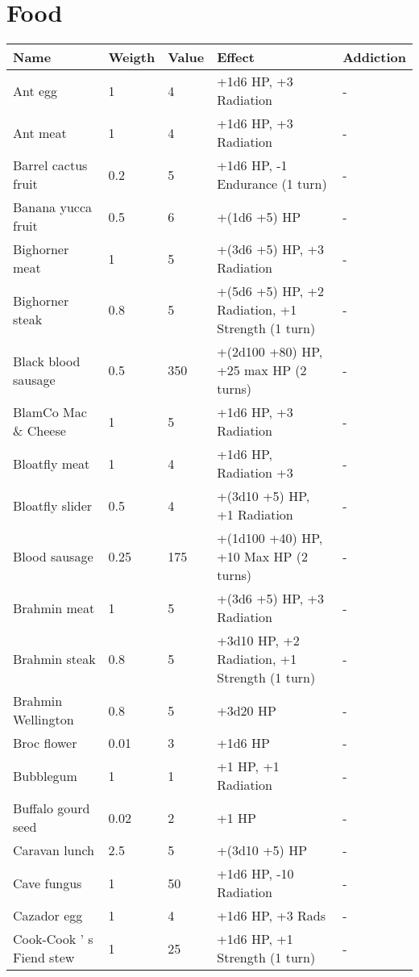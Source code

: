 \documentclass{report}
\begin{document}
\begin{table}[H]
\begin{table}[H]
\begin{table}[H]
\begin{table}[H]
\begin{table}[H]
\begin{table}[H]
\begin{table}[H]
\begin{table}[H]
\begin{table}[H]
\begin{table}[H]
\begin{table}[H]
\begin{table}[H]
\begin{table}[H]
\begin{table}[H]
\chapter{Food}
\begin{table}[H]
  \centering
  \begin{tabular}{p{30mm}p{30mm}p{30mm}p{30mm}p{30mm}}
\bfseries Name & \bfseries Weigth & \bfseries Value & \bfseries Effect & \bfseries Addiction \\
\hline
Ant egg  & 1 & 4 & +1d6 HP, +3 Radiation  & -  \\
Ant meat  & 1 & 4 & +1d6 HP, +3 Radiation  & -  \\
Barrel cactus fruit  & 0.2  & 5 & +1d6 HP, -1 Endurance (1 turn)  & -  \\
Banana yucca fruit  & 0.5  & 6 & +(1d6 +5) HP  & -  \\
Bighorner meat  & 1 & 5 & +(3d6 +5) HP, +3 Radiation  & -  \\
Bighorner steak  & 0.8  & 5 & +(5d6 +5) HP, +2 Radiation, +1 Strength (1 turn)  & -  \\
Black blood sausage  & 0.5  & 350 & +(2d100 +80) HP, +25 max HP (2 turns)  & -  \\
BlamCo Mac  \&  Cheese  & 1 & 5 & +1d6 HP, +3 Radiation  & -  \\
Bloatfly meat  & 1 & 4 & +1d6 HP, Radiation +3  & -  \\
Bloatfly slider  & 0.5  & 4 & +(3d10 +5) HP, +1 Radiation  & -  \\
Blood sausage  & 0.25  & 175 & +(1d100 +40) HP, +10 Max HP (2 turns)  & -  \\
Brahmin meat  & 1 & 5 & +(3d6 +5) HP, +3 Radiation  & -  \\
Brahmin steak  & 0.8  & 5 & +3d10 HP, +2 Radiation, +1 Strength (1 turn)  & -  \\
Brahmin Wellington  & 0.8  & 5 & +3d20 HP  & -  \\
Broc flower  & 0.01  & 3 & +1d6 HP  & -  \\
Bubblegum  & 1 & 1 & +1 HP, +1 Radiation  & -  \\
Buffalo gourd seed  & 0.02  & 2 & +1 HP & -  \\
Caravan lunch  & 2.5  & 5 & +(3d10 +5) HP  & -  \\
Cave fungus  & 1 & 50 & +1d6 HP, -10 Radiation  & -  \\
Cazador egg  & 1 & 4 & +1d6 HP, +3 Rads  & -  \\
Cook-Cook ' s Fiend stew  & 1 & 25 & +1d6 HP, +1 Strength (1 turn)  & -  \\

\end{tabular}
\end{table}
\end{table}
\end{table}
\end{table}
\end{table}
\end{table}
\end{table}
\end{table}
\end{table}
\end{table}
\end{table}
\end{table}
\end{table}
\end{table}
\end{table}
\end{document}
